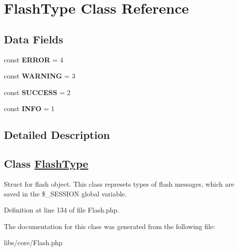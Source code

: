 \hypertarget{class_flash_type}{\section{\-Flash\-Type \-Class \-Reference}
\label{class_flash_type}
}
\subsection*{\-Data \-Fields}
\begin{DoxyCompactItemize}
\item 
\hypertarget{class_flash_type_a7f79d7b73cfb40bb7855d4260393cc0f}{const {\bfseries \-E\-R\-R\-O\-R} = 4}\label{class_flash_type_a7f79d7b73cfb40bb7855d4260393cc0f}

\item 
\hypertarget{class_flash_type_ad0c7ccd2f8b92a760391d21d0ec7b339}{const {\bfseries \-W\-A\-R\-N\-I\-N\-G} = 3}\label{class_flash_type_ad0c7ccd2f8b92a760391d21d0ec7b339}

\item 
\hypertarget{class_flash_type_a2bc61f90ca5d5a1f79769d1d9e38842b}{const {\bfseries \-S\-U\-C\-C\-E\-S\-S} = 2}\label{class_flash_type_a2bc61f90ca5d5a1f79769d1d9e38842b}

\item 
\hypertarget{class_flash_type_af2d1bd27ecbe33ecaadb558404e9c669}{const {\bfseries \-I\-N\-F\-O} = 1}\label{class_flash_type_af2d1bd27ecbe33ecaadb558404e9c669}

\end{DoxyCompactItemize}


\subsection{\-Detailed \-Description}
\subsection*{\-Class \hyperlink{class_flash_type}{\-Flash\-Type}}

\-Struct for flash object. \-This class represets types of flash messages, which are saved in the \$\-\_\-\-S\-E\-S\-S\-I\-O\-N global variable.  

\-Definition at line 134 of file \-Flash.\-php.



\-The documentation for this class was generated from the following file\-:\begin{DoxyCompactItemize}
\item 
libs/core/\-Flash.\-php\end{DoxyCompactItemize}
